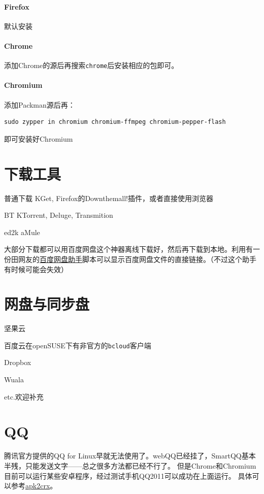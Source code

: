 \documentclass[11pt,openany]{book}
\newcommand{\soft}[1]{\texttt{\textcolor{dgreen}{#1}}}
\begin{document}
\paragraph{Firefox}默认安装

\paragraph{Chrome}添加Chrome的源后再搜索\soft{chrome}后安装相应的包即可。

\paragraph{Chromium}添加Packman源后再：
\begin{Verbatim}[formatcom=\color{codec}]
    sudo zypper in chromium chromium-ffmpeg chromium-pepper-flash
\end{Verbatim}
即可安装好Chromium
\section{下载工具}
\begin{compactdesc}
 \item[普通下载] KGet, Firefox的Down\-them\-all!插件，或者直接使用浏览器
 \item[BT] KTorrent, Deluge, Transmition
 \item[ed2k] aMule
\end{compactdesc}

大部分下载都可以用百度网盘这个神器离线下载好，然后再下载到本地。利用有一份田网友的\href{http://git.oschina.net/youyifentian/dupanlink}{百度网盘助手}脚本可以显示百度网盘文件的直接链接。（不过这个助手有时候可能会失效）
\section{网盘与同步盘}
\begin{compactitem}
 \item 坚果云
 \item 百度云在openSUSE下有非官方的\soft{bcloud}客户端
 \item Dropbox
 \item Wuala
 \item etc.欢迎补充
\end{compactitem}
\section{QQ}
腾讯官方提供的QQ for Linux早就无法使用了。webQQ已经挂了，SmartQQ基本半残，只能发送文字——总之很多方法都已经不行了。
但是Chrome和Chromium目前可以运行某些安卓程序，经过测试手机QQ2011可以成功在上面运行。
具体可以参考\href{http://huodong.ustc.edu.cn/Crx}{apk2crx}。
\end{document}

